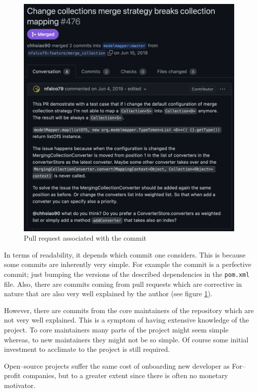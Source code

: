 \documentclass[12pt]{article}
\begin{document}
\begin{figure}[H]
    \centering
    \includegraphics[width=14cm]{images/pull-request.png}
    \caption{Pull request associated with the  commit}
    \label{pull-request}
\end{figure}

In terms of readability, it depends which commit one considers.
This is because some commits are inherently very simple. For
example the  commit is a perfective commit; just bumping
the versions of the described dependencies in the
\texttt{pom.xml} file. Also, there are commits coming from pull
requests which are corrective in nature that are also very well
explained by the author (see figure \ref{pull-request}).

However, there are commits from the core maintainers of the
repository which are not very well explained. This is a symptom
of having extensive knowledge of the project. To core
maintainers many parts of the project might seem simple whereas,
to new maintainers they might not be so simple. Of course some
initial investment to acclimate to the project is still
required.

Open--source projects suffer the same cost of onboarding new
developer as For--profit companies, but to a greater extent
since there is often no monetary motivator.
\end{document}
